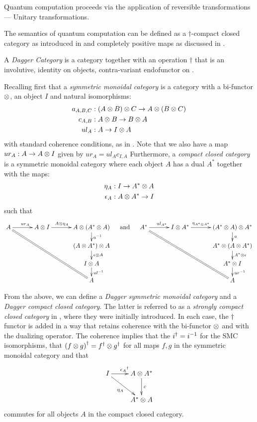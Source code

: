 Quantum computation proceeds via the application of reversible transformations --- Unitary
transformations.

The semantics of quantum computation can be defined as a $\dagger$-compact closed category as
introduced in \cite{abramsky02:traces,abramsky05:abstracttraces} and completely positive maps as
discussed in \cite{selinger05:dagger}.

\begin{definition}
  A \emph{Dagger Category}\cite{selinger05:dagger} is a category \C together with an operation
  $\dagger$ that is an involutive, identity on objects, contra-variant endofunctor on \C.
\end{definition}
Recalling first that a \emph{symmetric monoidal category} is a category \B with a bi-functor $\otimes$,
an object $I$ and natural isomorphisms:
\begin{align*}
  a_{A,B,C}&: (A\otimes B)\otimes C \to A\otimes (B\otimes C)\\
  c_{A,B} &:A\otimes B \to B\otimes A\\
  ul_A &:A \to I \otimes A
\end{align*}
with standard coherence conditions, as in \cite{maclan97:categorieswrkmath}. Note that we
also have a map $ur_A: A \to A\otimes I$ given by $ur_A = ul_A c_{I,A}$ Furthermore, a \emph{compact
closed category} \C is a symmetric monoidal category where each object $A$ has a dual $A^{*}$
together with the maps:
\begin{align*}
  \eta_A:I \to {A}^{*} \otimes A\\
  \epsilon_A : A\otimes{A}^{*} \to I
\end{align*}
such that
\[
  \xymatrix@C+8pt@R-10pt{
    A \ar[r]^{ur_A} \ar@{=}[dddrr]
      & A\* I \ar[r]^(.4){A\*\eta_A}
      & A\* (\dual{A}\*A) \ar[d]^{a^{-1}}\\
    & & (A\*\dual{A})\*A \ar[d]^{\epsilon\*A}\\
    & & I\* A \ar[d]^{ul^{-1}}\\
    & & A
  }
  \quad\text{ and  }\quad
  \xymatrix@C+8pt@R-10pt{
    \dual{A} \ar[r]^{ul_{\dual{A}}} \ar@{=}[dddrr]
      & I\*\dual{A} \ar[r]^(.4){\eta_{\dual{A}\*\dual{A}}}
      & (\dual{A}\*A)\*\dual{A} \ar[d]^{a}\\
    & & \dual{A}\*(A\*\dual{A}) \ar[d]^{\dual{A}\*\epsilon}\\
    & & \dual{A}\*I \ar[d]^{ur^{-1}}\\
    & & A
  }
\]

From the above, we can define a \emph{Dagger symmetric monoidal category} and a \emph{Dagger
compact closed category}. The latter is referred to as a \emph{strongly compact closed category} in
\cite{abramsky02:traces}, where they were initially introduced. In each case, the $\dagger$ functor
is added in a way that retains coherence with the bi-functor $\otimes$ and with the dualizing operator.
The coherence implies that the ${i}^{\dagger} = i^{-1}$ for the SMC isomorphisms, that ${(f\otimes g)}^{\dagger} =
{f}^{\dagger}\otimes{g}^{\dagger}$ for all maps $f,g$ in the symmetric monoidal category and that
\[
  \xymatrix{
    I \ar[dr]_{\eta_A} \ar[r]^{\dgr{\epsilon_A}} & A\* \dual{A} \ar[d]^{c} \\
    &\dual{A}\*A
  }
\]
commutes for all objects $A$ in the compact closed category.



